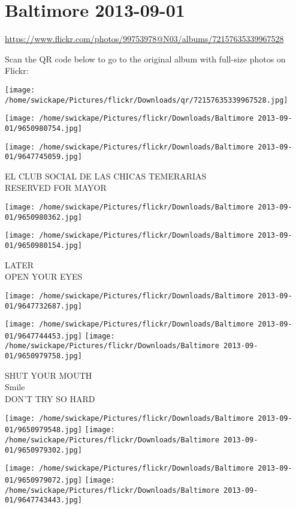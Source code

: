\documentclass[10pt,letterpaper]{article}
\title{}
\author{}
\date{}
\begin{document}
\section*{Baltimore 2013-09-01}

\url{https://www.flickr.com/photos/99753978@N03/albums/72157635339967528}

Scan the QR code below to go to the original album with full-size photos on Flickr:

\texttt{[image: /home/swickape/Pictures/flickr/Downloads/qr/72157635339967528.jpg]}
\pagebreak

\texttt{[image: /home/swickape/Pictures/flickr/Downloads/Baltimore 2013-09-01/9650980754.jpg]}

\vspace{0.25in}
\texttt{[image: /home/swickape/Pictures/flickr/Downloads/Baltimore 2013-09-01/9647745059.jpg]}

EL CLUB SOCIAL DE LAS CHICAS TEMERARIAS\\
RESERVED FOR MAYOR
\pagebreak

\texttt{[image: /home/swickape/Pictures/flickr/Downloads/Baltimore 2013-09-01/9650980362.jpg]}

\vspace{0.25in}
\texttt{[image: /home/swickape/Pictures/flickr/Downloads/Baltimore 2013-09-01/9650980154.jpg]}

LATER\\
OPEN YOUR EYES
\pagebreak

\texttt{[image: /home/swickape/Pictures/flickr/Downloads/Baltimore 2013-09-01/9647732687.jpg]}

\vspace{0.25in}
\texttt{[image: /home/swickape/Pictures/flickr/Downloads/Baltimore 2013-09-01/9647744453.jpg]}
\texttt{[image: /home/swickape/Pictures/flickr/Downloads/Baltimore 2013-09-01/9650979758.jpg]}

SHUT YOUR MOUTH\\
Smile\\
DON'T TRY SO HARD
\pagebreak

\texttt{[image: /home/swickape/Pictures/flickr/Downloads/Baltimore 2013-09-01/9650979548.jpg]}
\texttt{[image: /home/swickape/Pictures/flickr/Downloads/Baltimore 2013-09-01/9650979302.jpg]}

\texttt{[image: /home/swickape/Pictures/flickr/Downloads/Baltimore 2013-09-01/9650979072.jpg]}
\texttt{[image: /home/swickape/Pictures/flickr/Downloads/Baltimore 2013-09-01/9647743443.jpg]}
\end{document}
